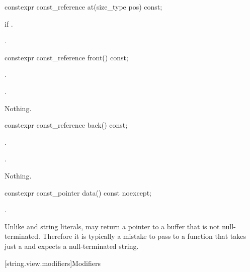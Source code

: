 %
\begin{itemdecl}
constexpr const_reference at(size_type pos) const;
\end{itemdecl}

\begin{itemdescr}
\pnum
\throws
{} if .

\pnum
\returns
{}.
\end{itemdescr}

%
\begin{itemdecl}
constexpr const_reference front() const;
\end{itemdecl}

\begin{itemdescr}
\pnum
\requires
{}.

\pnum
\returns
{}.

\pnum
\throws
Nothing.
\end{itemdescr}

%
\begin{itemdecl}
constexpr const_reference back() const;
\end{itemdecl}

\begin{itemdescr}
\pnum
\requires
{}.

\pnum
\returns
{}.

\pnum
\throws
Nothing.
\end{itemdescr}

%
\begin{itemdecl}
constexpr const_pointer data() const noexcept;
\end{itemdecl}

\begin{itemdescr}
\pnum
\returns
{}.

\pnum
\begin{note}
Unlike  and string literals,
 may return a pointer to a buffer that is not null-terminated.
Therefore it is typically a mistake to pass  to a function that takes just a  and expects a null-terminated string.
\end{note}
\end{itemdescr}

[string.view.modifiers]{Modifiers}

